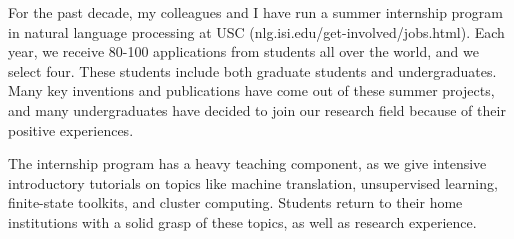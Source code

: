 
\noindent
For the past decade, my colleagues and I have run a summer internship 
program in natural language processing at USC 
(nlg.isi.edu/get-involved/jobs.html).  Each year, we receive 80-100 
applications from students all over the world, and we select four.  
These students include both graduate students 
and undergraduates.  Many key inventions and publications have come 
out of these summer projects, and many undergraduates have decided to join 
our research field because of their positive experiences.  

The internship program has a heavy teaching component, as we give
intensive introductory tutorials on topics like
machine translation, unsupervised learning,
finite-state toolkits, and cluster computing.  Students return to
their home institutions with a solid grasp of these topics, as well
as research experience.


